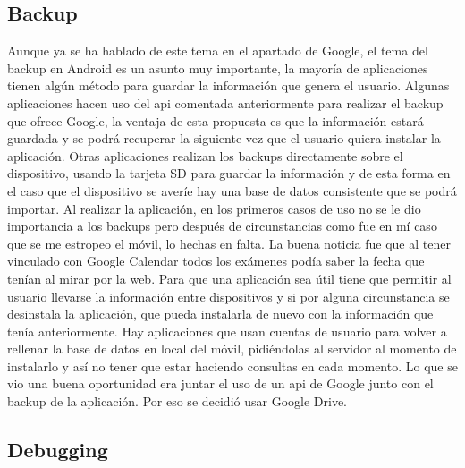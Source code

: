 \subsection{Backup}
\label{subsecc:Backup}

Aunque ya se ha hablado de este tema en el apartado de Google, el tema del backup en Android es un asunto muy importante, la mayoría de aplicaciones tienen algún método para guardar la información que genera el usuario.
Algunas aplicaciones hacen uso del api comentada anteriormente para realizar el backup que ofrece Google, la ventaja de esta propuesta es que la información estará guardada y se podrá recuperar la siguiente vez que el usuario quiera instalar la aplicación.
Otras aplicaciones realizan los backups directamente sobre el dispositivo, usando la tarjeta SD para guardar la información y de esta forma en el caso que el dispositivo se averíe hay una base de datos consistente que se podrá importar.
Al realizar la aplicación, en los primeros casos de uso no se le dio importancia a los backups pero después de circunstancias como fue en mí caso que se me estropeo el móvil, lo hechas en falta. La buena noticia fue que al tener vinculado con Google Calendar todos los exámenes podía saber la fecha que tenían al mirar por la web.
Para que una aplicación sea útil tiene que permitir al usuario llevarse la información entre dispositivos y si por alguna circunstancia se desinstala la aplicación, que pueda instalarla de nuevo con la información que tenía anteriormente.
Hay aplicaciones que usan cuentas de usuario para volver a rellenar la base de datos en local del móvil, pidiéndolas al servidor al momento de instalarlo y así no tener que estar haciendo consultas en cada momento.
Lo que se vio una buena oportunidad era juntar el uso de un api de Google junto con el backup de la aplicación. Por eso se decidió usar Google Drive.

\subsection{Debugging}
\label{subsecc:Debugging}

